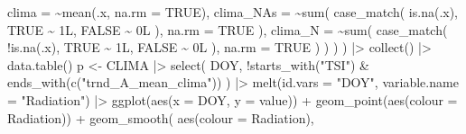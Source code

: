\documentclass[
  10pt,
  a4paper,oneside]{article}
\newenvironment{Shaded}{\begin{snugshade}}{\end{snugshade}}
\newcommand{\AttributeTok}[1]{\textcolor[rgb]{0.77,0.63,0.00}{#1}}
\newcommand{\ConstantTok}[1]{\textcolor[rgb]{0.00,0.00,0.00}{#1}}
\newcommand{\FunctionTok}[1]{\textcolor[rgb]{0.00,0.00,0.00}{#1}}
\newcommand{\NormalTok}[1]{#1}
\newcommand{\OtherTok}[1]{\textcolor[rgb]{0.56,0.35,0.01}{#1}}
\newcommand{\SpecialCharTok}[1]{\textcolor[rgb]{0.00,0.00,0.00}{#1}}
\newcommand{\StringTok}[1]{\textcolor[rgb]{0.31,0.60,0.02}{#1}}
\begin{document}
\begin{Shaded}
\begin{Highlighting}[]
                    \AttributeTok{clima =} \SpecialCharTok{\textasciitilde{}}\FunctionTok{mean}\NormalTok{(.x, }\AttributeTok{na.rm =} \ConstantTok{TRUE}\NormalTok{),}
                    \AttributeTok{clima\_NAs =} \SpecialCharTok{\textasciitilde{}}\FunctionTok{sum}\NormalTok{(}
                      \FunctionTok{case\_match}\NormalTok{(}
                        \FunctionTok{is.na}\NormalTok{(.x),}
                        \ConstantTok{TRUE} \SpecialCharTok{\textasciitilde{}}\NormalTok{ 1L, }\ConstantTok{FALSE} \SpecialCharTok{\textasciitilde{}}\NormalTok{ 0L}
\NormalTok{                    ),}
                      \AttributeTok{na.rm =} \ConstantTok{TRUE}
\NormalTok{                  ),}
                    \AttributeTok{clima\_N =} \SpecialCharTok{\textasciitilde{}}\FunctionTok{sum}\NormalTok{(}
                      \FunctionTok{case\_match}\NormalTok{(}
                        \SpecialCharTok{!}\FunctionTok{is.na}\NormalTok{(.x),}
                        \ConstantTok{TRUE} \SpecialCharTok{\textasciitilde{}}\NormalTok{ 1L, }\ConstantTok{FALSE} \SpecialCharTok{\textasciitilde{}}\NormalTok{ 0L}
\NormalTok{                    ),}
                      \AttributeTok{na.rm =} \ConstantTok{TRUE}
\NormalTok{                  )}
\NormalTok{                )}
\NormalTok{              )}
\NormalTok{            ) }\SpecialCharTok{|\textgreater{}}
            \FunctionTok{collect}\NormalTok{() }\SpecialCharTok{|\textgreater{}}
            \FunctionTok{data.table}\NormalTok{()}
\NormalTok{        p }\OtherTok{\textless{}{-}}\NormalTok{ CLIMA }\SpecialCharTok{|\textgreater{}}
            \FunctionTok{select}\NormalTok{(}
\NormalTok{                DOY, }\SpecialCharTok{!}\FunctionTok{starts\_with}\NormalTok{(}\StringTok{"TSI"}\NormalTok{) }\SpecialCharTok{\&}
                  \FunctionTok{ends\_with}\NormalTok{(}\FunctionTok{c}\NormalTok{(}\StringTok{"trnd\_A\_mean\_clima"}\NormalTok{))}
\NormalTok{            ) }\SpecialCharTok{|\textgreater{}}
            \FunctionTok{melt}\NormalTok{(}\AttributeTok{id.vars =} \StringTok{"DOY"}\NormalTok{, }\AttributeTok{variable.name =} \StringTok{"Radiation"}\NormalTok{) }\SpecialCharTok{|\textgreater{}}
            \FunctionTok{ggplot}\NormalTok{(}\FunctionTok{aes}\NormalTok{(}\AttributeTok{x =}\NormalTok{ DOY, }\AttributeTok{y =}\NormalTok{ value)) }\SpecialCharTok{+}
            \FunctionTok{geom\_point}\NormalTok{(}\FunctionTok{aes}\NormalTok{(}\AttributeTok{colour =}\NormalTok{ Radiation)) }\SpecialCharTok{+}
            \FunctionTok{geom\_smooth}\NormalTok{(}
                \FunctionTok{aes}\NormalTok{(}\AttributeTok{colour =}\NormalTok{ Radiation),}

\end{Highlighting}
\end{Shaded}
\end{document}
